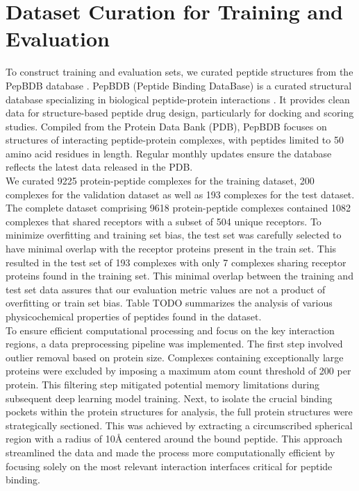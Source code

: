 \section{Dataset Curation for Training and Evaluation}
To construct training and evaluation sets, we curated peptide structures from the PepBDB database \cite{Wen2019}. PepBDB (Peptide Binding DataBase) is a curated structural database specializing in biological peptide-protein interactions \cite{Wen2019}. It provides clean data for structure-based peptide drug design, particularly for docking and scoring studies. Compiled from the Protein Data Bank (PDB), PepBDB focuses on structures of interacting peptide-protein complexes, with peptides limited to 50 amino acid residues in length. Regular monthly updates ensure the database reflects the latest data released in the PDB. \\

We curated 9225 protein-peptide complexes for the training dataset, 200 complexes for the validation dataset as well as 193 complexes for the test dataset. The complete dataset comprising 9618 protein-peptide complexes contained 1082 complexes that shared receptors with a subset of 504 unique receptors. To minimize overfitting and training set bias, the test set was carefully selected to have minimal overlap with the receptor proteins present in the train set. This resulted in the test set of 193 complexes with only 7 complexes sharing receptor proteins found in the training set. This minimal overlap between the training and test set data assures that our evaluation metric values are not a product of overfitting or train set bias. Table TODO summarizes the analysis of various physicochemical properties of peptides found in the dataset. \\

To ensure efficient computational processing and focus on the key interaction regions, a data preprocessing pipeline was implemented. The first step involved outlier removal based on protein size. Complexes containing exceptionally large proteins were excluded by imposing a maximum atom count threshold of 200 per protein. This filtering step mitigated potential memory limitations during subsequent deep learning model training. Next, to isolate the crucial binding pockets within the protein structures for analysis, the full protein structures were strategically sectioned. This was achieved by extracting a circumscribed spherical region with a radius of 10Å centered around the bound peptide. This approach streamlined the data and made the process more computationally efficient by focusing solely on the most relevant interaction interfaces critical for peptide binding. \\

